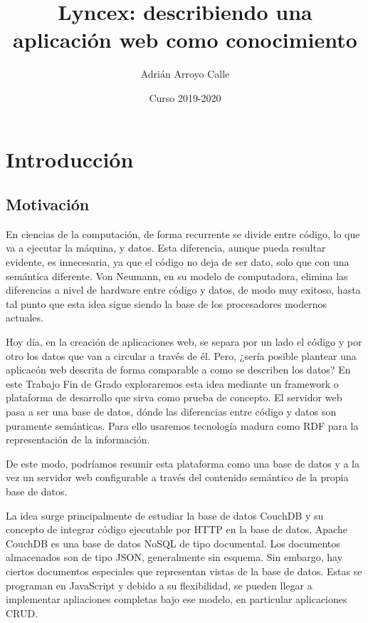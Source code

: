 \documentclass[12pt]{report} %
\title{Lyncex: describiendo una aplicación web como conocimiento}
\author{Adrián Arroyo Calle}
\date{Curso 2019-2020}
\begin{document}
\maketitle

\tableofcontents

\listoffigures

\listoftables

\chapter{Introducción}

\section{Motivación}

En ciencias de la computación, de forma recurrente se divide entre código, lo que va a ejecutar la máquina, y datos.
Esta diferencia, aunque pueda resultar evidente, es innecesaria, ya que el código no deja de ser dato, solo que con una semántica diferente.
Von Neumann, en su modelo de computadora\cite{wiki:neumann}, elimina las diferencias a nivel de hardware entre código y datos, de modo muy exitoso, hasta tal punto que esta idea sigue siendo la base de los procesadores modernos actuales.

Hoy día, en la creación de aplicaciones web, se separa por un lado el código y por otro los datos que van a circular a través de él. 
Pero, ¿sería posible plantear una aplicacón web descrita de forma comparable a como se describen los datos? En este Trabajo Fin de Grado exploraremos esta idea mediante un framework o plataforma de desarrollo que sirva como prueba de concepto. El servidor web pasa a ser una base de datos, dónde las diferencias entre código y datos son puramente semánticas. Para ello usaremos tecnología madura como RDF para la representación de la información.\cite{rdf}

De este modo, podríamos resumir esta plataforma como una base de datos y a la vez un servidor web configurable a través del contenido semántico de la propia base de datos.

La idea surge principalmente de estudiar la base de datos CouchDB y su concepto de integrar código ejecutable por HTTP en la base de datos. Apache CouchDB es una base de datos NoSQL de tipo documental. Los documentos almacenados son de tipo JSON, generalmente sin esquema. Sin embargo, hay ciertos documentos especiales que representan vistas de la base de datos. Estas se programan en JavaScript y debido a su flexibilidad, se pueden llegar a implementar apliaciones completas bajo ese modelo, en particular aplicaciones CRUD.\cite{couchapp}
\end{document}
